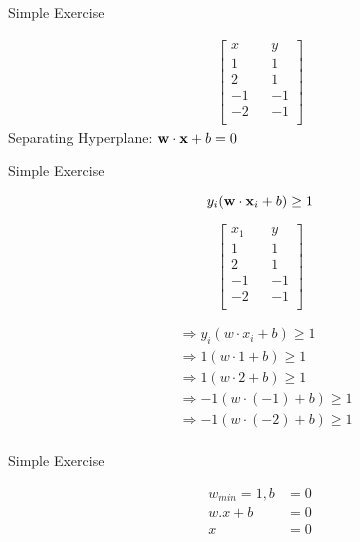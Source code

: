 \documentclass{beamer}
\begin{document}
\begin{frame}{Simple Exercise}

\begin{align*}
\begin{bmatrix}
x && y \\
1 && 1\\
2 && 1\\
-1 && -1\\
-2 && -1\\
\end{bmatrix}
\end{align*}
Separating Hyperplane: $\mathbf{w} \cdot \mathbf{x} + b = 0$
\end{frame}

\begin{frame}{Simple Exercise}
\begin{tcolorbox}

\begin{equation*}
y_{i}(\mathbf{w} \cdot \mathbf{x}_{i} + b) \geq 1
\end{equation*}
\end{tcolorbox}
\begin{multicols}{2}
\begin{equation*}
\begin{bmatrix}
x_{1} && y \\
1 && 1\\
2 && 1\\
-1 && -1\\
-2 && -1\\
\end{bmatrix}
\end{equation*}\break

\begin{align*}
&\Rightarrow y_{i}(w \cdot x_{i} + b) \geq 1\\
&\Rightarrow 1(w \cdot 1 + b) \geq 1\\
&\Rightarrow 1(w \cdot 2 + b)\geq 1\\
&\Rightarrow -1(w \cdot (-1)+b) \geq 1\\
&\Rightarrow -1(w \cdot (-2)+b) \geq 1\\
\end{align*}


\end{multicols}
\end{frame}

{
	
}


\begin{frame}{Simple Exercise}

\begin{align*}
w_{min} = 1, b&= 0\\
w.x + b &= 0\\
x &=0 \\
\end{align*}

\end{frame}
\end{document}
